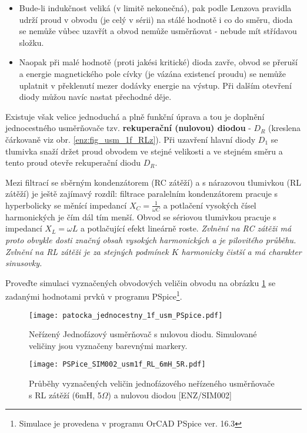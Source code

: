       \begin{itemize}
        \item Bude-li indukčnost veliká (v limitě nekonečná), pak podle Lenzova pravidla udrží proud v obvodu (je celý v sérii) na stálé hodnotě i co do směru, dioda se nemůže vůbec uzavřít a obvod nemůže usměrňovat - nebude mít střídavou složku.
        \item Naopak při malé hodnotě (proti jakési kritické) dioda zavře, obvod se přeruší a energie magnetického pole cívky (je vázána existencí proudu) se nemůže uplatnit v překlenutí mezer dodávky energie na výstup. Při dalším otevření diody můžou navíc nastat přechodné děje.
      \end{itemize}

      Existuje však velice jednoduchá a plně funkční úprava a tou je doplnění jednocestného usměrňovače tzv. \textbf{rekuperační (nulovou) diodou} -
      $D_R$ (kreslena čárkovaně viz obr. \ref{enz:fig_usm_1f_RLz}). Při uzavření hlavní diody $D_1$ se tlumivka snaží držet proud obvodem ve stejné
      velikosti a ve stejném směru a tento proud otevře rekuperační diodu $D_R$.

      Mezi filtrací se sběrným kondenzátorem (RC zátěží) a s nárazovou tlumivkou (RL zátěží) je ještě zajímavý rozdíl: filtrace paralelním
      kondenzátorem pracuje s hyperbolicky se měnící impedancí $X_C=\frac{1}{\omega C}$ a potlačení vysokých čísel harmonických je čím dál tím menší.
      Obvod se sériovou tlumivkou pracuje s impedancí $X_L=\omega L$ a potlačující efekt lineárně roste. \emph{Zvlnění na RC zátěži má proto obvykle
      dosti značný obsah vysokých harmonických a je pilovitého průběhu. Zvlnění na RL zátěži je za stejných podmínek $K$ harmonicky čistší a má
      charakter sinusovky.}
      \begin{example}
        Proveďte simulaci vyznačených obvodových veličin obvodu na obrá\-zku \ref{enz:fig_SIM002_sch} se zadanými hodnotami prvků v programu
        PSpice\footnote{Simulace je provedena v programu OrCAD PSpice ver. 16.3}.
        \begin{figure}[ht!]
          \centering
          \texttt{[image: patocka\_jednocestny\_1f\_usm\_PSpice.pdf]}
          \caption{Neřízený Jednofázový usměrňovač s nulovou diodu. Simulované veličiny jsou vyznačeny barevnými markery.}
          \label{enz:fig_SIM002_sch}
        \end{figure}

        \begin{figure}[ht!]
          \centering
          \texttt{[image: PSPice\_SIM002\_usm1f\_RL\_6mH\_5R.pdf]}
          \caption[Jednofázový neřízený usměrňovač s RL zátěží]{Průběhy vyznačených veličin jednofázového neřízeného usměrňovače s RL zátěží (6mH, 5$\Omega$) a nulovou diodou [ENZ/SIM002]}
          \label{enz:fig_exam_PSPICE_SIM002}
      \end{figure}

      \end{example}


